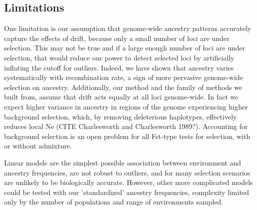 \documentclass[12pt]{report}
\begin{document}
\subsection{Limitations}
One limitation is our assumption that genome-wide ancestry patterns accurately capture the effects of drift, because only a small number of loci are under selection. This may not be true and if a large enough number of loci are under selection, that would reduce our power to detect selected loci by artificially inflating the cutoff for outliers. Indeed, we have shown that ancestry varies systematically with recombination rate, a sign of more pervasive genome-wide selection on ancestry. Additionally, our method and the family of methods we built from, assume that drift acts equally at all loci genome-wide. In fact we expect higher variance in ancestry in regions of the genome experiencing higher background selection, which, by removing deleterious haplotypes, effectively reduces local Ne (CITE Charlesworth and Charlesworth 1989?). Accounting for background selection is an open problem for all Fst-type tests for selection, with or without admixture.  

Linear models are the simplest possible association between environment and ancestry frequencies, are not robust to outliers, and for many selection scenarios are unlikely to be biologically accurate. However, other more complicated models could be tested with our 'standardized' ancestry frequencies, complexity limited only by the number of populations and range of environments sampled.
\end{document}
